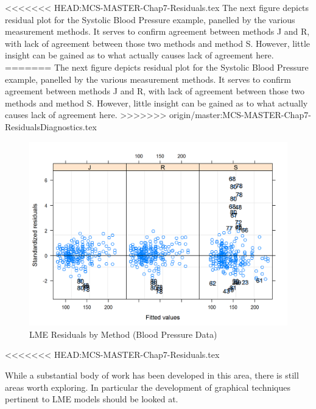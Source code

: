 \documentclass[12pt, a4paper]{report}
\theoremstyle{plain}
\theoremstyle{definition}
\theoremstyle{remark}
\begin{document}
	
	
<<<<<<< HEAD:MCS-MASTER-Chap7-Residuals.tex
The next figure depicts residual plot for the Systolic Blood Pressure example, panelled by the various measurement methods. It serves to confirm agreement between methods J and R, with lack of agreement between those two methods and method S. However, little insight can be gained as to what actually causes lack of agreement here. 
=======
	The next figure depicts residual plot for the Systolic Blood Pressure example, panelled by the various measurement methods. It serves to confirm agreement between methods J and R, with lack of agreement between those two methods and method S. However, little insight can be gained as to what actually causes lack of agreement here. 
>>>>>>> origin/master:MCS-MASTER-Chap7-ResidualsDiagnostics.tex
\begin{figure}[h!]
		\centering
		\includegraphics[width=0.8\linewidth]{images/bloodnlme-ResidPlot}
		\caption{LME Residuals by Method (Blood Pressure Data)}
\end{figure}
<<<<<<< HEAD:MCS-MASTER-Chap7-Residuals.tex

While a substantial body of work has been developed in this area, there is still areas worth exploring. 
In particular the development of graphical techniques pertinent to LME models should be looked at.
	
\end{document}
